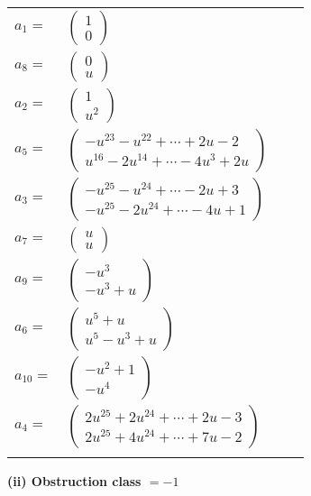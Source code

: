 \documentclass[1p]{elsarticle_modified}
\theoremstyle{definition}
\begin{document}
\begin{tabular}{m{7pt} m{180pt} m{7pt} m{180pt} }
\flushright $a_{1}=$&$\begin{pmatrix}1\\0\end{pmatrix}$ \\
\flushright $a_{8}=$&$\begin{pmatrix}0\\u\end{pmatrix}$ \\
\flushright $a_{2}=$&$\begin{pmatrix}1\\u^2\end{pmatrix}$ \\
\flushright $a_{5}=$&$\begin{pmatrix}- u^{23}- u^{22}+\cdots+2 u-2\\u^{16}-2 u^{14}+\cdots-4 u^3+2 u\end{pmatrix}$ \\
\flushright $a_{3}=$&$\begin{pmatrix}- u^{25}- u^{24}+\cdots-2 u+3\\- u^{25}-2 u^{24}+\cdots-4 u+1\end{pmatrix}$ \\
\flushright $a_{7}=$&$\begin{pmatrix}u\\u\end{pmatrix}$ \\
\flushright $a_{9}=$&$\begin{pmatrix}- u^3\\- u^3+u\end{pmatrix}$ \\
\flushright $a_{6}=$&$\begin{pmatrix}u^5+u\\u^5- u^3+u\end{pmatrix}$ \\
\flushright $a_{10}=$&$\begin{pmatrix}- u^2+1\\- u^4\end{pmatrix}$ \\
\flushright $a_{4}=$&$\begin{pmatrix}2 u^{25}+2 u^{24}+\cdots+2 u-3\\2 u^{25}+4 u^{24}+\cdots+7 u-2\end{pmatrix}$\\&\end{tabular}
\flushleft \textbf{(ii) Obstruction class $= -1$}\\~\\
\end{document}
